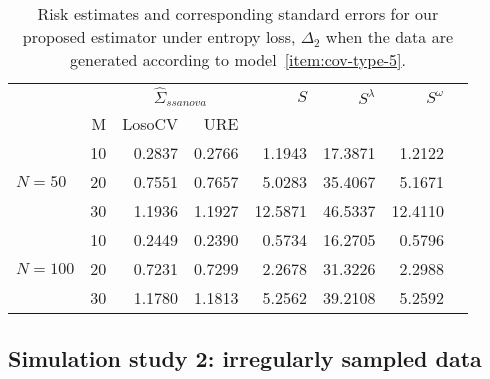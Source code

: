 \documentclass[12pt]{article}
\theoremstyle{definition}
\begin{document}

\begin{table}[H]
\centering
\caption{Risk estimates and corresponding standard errors for our proposed estimator under entropy loss, $\Delta_2$ when the data are generated according to model~\ref{item:cov-type-5}.} 
\begin{tabular}{l|r|rrrrrr}
&  & \multicolumn{2}{c}{$\hat{\Sigma}_{ssanova}$} & $S$ & $S^\lambda$ & $S^\omega$ \\ 
&M & \mbox{LosoCV} & \mbox{URE} &  \\ 
  \hline
 &    10 & 0.2837 & 	  0.2766	& 1.1943 &  17.3871 & 1.2122 \\ 
$N = 50$&    20 & 0.7551& 0.7657& 5.0283& 35.4067 & 5.1671 \\ 
  &    30 & 1.1936 & 1.1927& 12.5871& 46.5337 & 12.4110  \\ \hdashline
 &    10 & 0.2449 &  0.2390 & 0.5734 & 16.2705 & 0.5796\\ 
  $N = 100$ &    20 & 0.7231 & 0.7299 & 2.2678& 31.3226 & 2.2988 \\ 
   &    30 & 1.1780 & 1.1813 & 5.2562 & 39.2108 & 5.2592 \\
  \end{tabular}
\end{table}


\subsection{Simulation study 2: irregularly sampled data}

\setlength{\dashlinedash}{0.5pt}
\setlength{\dashlinegap}{1pt}
\setlength{\arrayrulewidth}{0.2pt}
\end{document}
